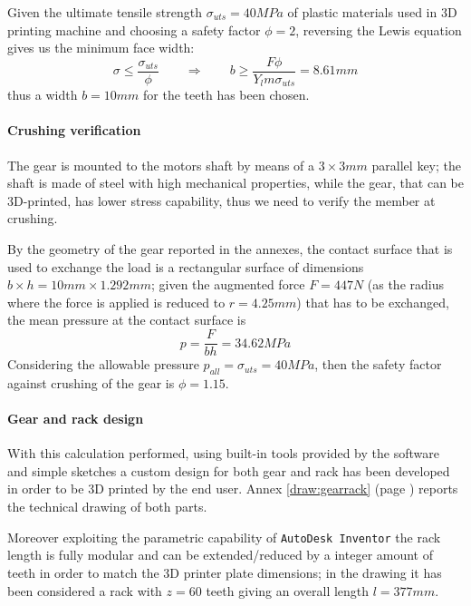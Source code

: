 	Given the ultimate tensile strength $\sigma_{uts} = 40MPa$ of plastic materials used in 3D printing machine and choosing a safety factor $\phi= 2$, reversing the Lewis equation gives us the minimum face width:
	\[ \sigma \leq \frac{\sigma_{uts}}{\phi} \qquad \Rightarrow \qquad b \geq \frac{F \phi}{Y_l m \sigma_{uts}} = 8.61mm \]
	thus a width $b = 10mm$ for the teeth has been chosen.
	
	\paragraph{Crushing verification} The gear is mounted to the motors shaft by means of a $3\times 3mm$ parallel key; the shaft is made of steel with high mechanical properties, while the gear, that can be 3D-printed, has lower stress capability, thus we need to verify the member at crushing.
	
	By the geometry of the gear reported in the annexes, the contact surface that is used to exchange the load is a rectangular surface of dimensions $b\times h = 10 mm \times 1.292mm$; given the augmented force $F = 447N$ (as the radius where the force is applied is reduced to $r = 4.25mm$) that has to be exchanged, the mean pressure at the contact surface is
	\[ p = \frac{F}{bh} = 34.62MPa \]
	Considering the allowable pressure $p_{all} = \sigma_{uts} = 40MPa$, then the safety factor against crushing of the gear is $\phi = 1.15$.
	
	\paragraph{Gear and rack design} With this calculation performed, using built-in tools provided by the software and simple sketches a custom design for both gear and rack has been developed in order to be 3D printed by the end user. Annex \ref{draw:gearrack} (page \pageref{draw:gearrack}) reports the technical drawing of both parts.
	
	Moreover exploiting the parametric capability of \texttt{AutoDesk Inventor} the rack length is fully modular and can be extended/reduced by a integer amount of teeth in order to match the 3D printer plate dimensions; in the drawing it has been considered a rack with $z = 60$ teeth giving an overall length $l = 377mm$. 
	
	
	